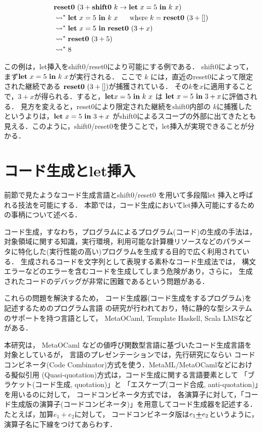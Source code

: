\begin{align*}
  &\textbf{reset0}~ (3 + \textbf{shift0}~ k \to \textbf{let}~ x = 5~ \textbf{in}~ k~ x) \\
  &\leadsto^* \textbf{let}~ x = 5~ \textbf{in}~ k~ x ~~~~~\text{where}~k = \textbf{reset0}~ (3 + []) \\
  &\leadsto^* \textbf{let}~ x = 5~ \textbf{in}~ \textbf{reset0}~ (3 + x) \\
  &\leadsto^* \textbf{reset0}~ (3 + 5) \\
  &\leadsto^* 8 \\
\end{align*}

この例は，let挿入をshift0/reset0により可能にする例である．
shift0によって，まず$\textbf{let}~ x = 5~ \textbf{in}~ k~ x$が実行される．
ここで $k$ には，直近のreset0によって限定された継続である $\textbf{reset0}~ (3 + [])$が捕獲されている．
その$k$を$x$に適用することで，$3+x$が得られる．すると，$\textbf{let} x = 5~ \textbf{in}~ k~ x$ は $\textbf{let}~ x = 5~ \textbf{in}~ 3 + x$に評価される．
見方を変えると，reset0により限定された継続をshift0内部の $k$に捕獲したというよりは，$\textbf{let}~ x = 5~ \textbf{in}~ 3 + x$ がshift0によるスコープの外部に出てきたとも見える．このように，shift0/reset0を使うことで，let挿入が実現できることが分かる．

\section{コード生成とlet挿入}
前節で見たようなコード生成言語とshift0/reset0 を用いて多段階let 挿入と呼ばれる技法を可能にする．
本節では，コード生成においてlet挿入可能にするための事柄について述べる．

コード生成，すなわち，プログラムによるプログラム(コード)の生成の手法は，
対象領域に関する知識，実行環境，利用可能な計算機リソースなどのパラメー
タに特化した(実行性能の高い)プログラムを生成する目的で広く利用されている．
生成されるコードを文字列として表現する素朴なコード生成法では，
構文エラーなどのエラーを含むコードを生成してしまう危険があり，さらに，
生成されたコードのデバッグが非常に困難であるという問題がある．

これらの問題を解決するため，
コード生成器(コード生成をするプログラム)を記述するためのプログラム言語
の研究が行われており，特に静的な型システムのサポートを持つ言語として，
MetaOCaml, Template Haskell, Scala LMSなどがある．

本研究は，
MetaOCaml などの値呼び関数型言語に基づいたコード生成言語を対象としているが，
言語のプレゼンテーションでは，先行研究にならい
コードコンビネータ(Code Combinator)方式を使う．MetaML/MetaOCamlなどにおける擬似引用
(Quasi-quotation)方式は，コード生成に関する言語要素として
「ブラケット(コード生成, quotation)」と
「エスケープ(コード合成, anti-quotation)」を用いるのに対して，
コードコンビネータ方式では，
各演算子に対して，「コード生成版の演算子(コードコンビネータ)」を用意してコード生成器を記述する．
たとえば，加算$e_1+e_2$に対して，
コードコンビネータ版は$e_1 \underline{\textbf{+}} e_2$というように，
演算子名に下線をつけてあらわす．

